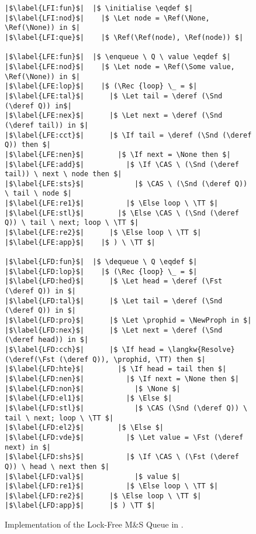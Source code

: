 \documentclass[a4paper, 10pt]{report}
\theoremstyle{definition}
\newcommand{\initialise}{\operatorname{initialize}}
\newcommand{\enqueue}{\operatorname{enqueue}}
\newcommand{\dequeue}{\operatorname{dequeue}}
\newcommand{\msq}{M\&S Queue}
\newcommand{\lfmsq}{Lock-Free \msq{}}
\begin{document}
\begin{figure}
\begin{verbatim}
|$\label{LFI:fun}$|  |$ \initialise \eqdef $|
|$\label{LFI:nod}$|    |$ \Let node = \Ref(\None, \Ref(\None)) in $|
|$\label{LFI:que}$|    |$ \Ref(\Ref(node), \Ref(node)) $|

|$\label{LFE:fun}$|  |$ \enqueue \ Q \ value \eqdef $|
|$\label{LFE:nod}$|    |$ \Let node = \Ref(\Some value, \Ref(\None)) in $|
|$\label{LFE:lop}$|    |$ (\Rec {loop} \_ = $|
|$\label{LFE:tal}$|      |$ \Let tail = \deref (\Snd (\deref Q)) in$|
|$\label{LFE:nex}$|      |$ \Let next = \deref (\Snd (\deref tail)) in $|
|$\label{LFE:cct}$|      |$ \If tail = \deref (\Snd (\deref Q)) then $|
|$\label{LFE:nen}$|        |$ \If next = \None then $|
|$\label{LFE:add}$|          |$ \If \CAS \ (\Snd (\deref tail)) \ next \ node then $|
|$\label{LFE:sts}$|            |$ \CAS \ (\Snd (\deref Q)) \ tail \ node $|
|$\label{LFE:re1}$|          |$ \Else loop \ \TT $|
|$\label{LFE:stl}$|        |$ \Else \CAS \ (\Snd (\deref Q)) \ tail \ next; loop \ \TT $|
|$\label{LFE:re2}$|      |$ \Else loop \ \TT $|
|$\label{LFE:app}$|    |$ ) \ \TT $|

|$\label{LFD:fun}$|  |$ \dequeue \ Q \eqdef $|
|$\label{LFD:lop}$|    |$ (\Rec {loop} \_ = $|
|$\label{LFD:hed}$|      |$ \Let head = \deref (\Fst (\deref Q)) in $|
|$\label{LFD:tal}$|      |$ \Let tail = \deref (\Snd (\deref Q)) in $|
|$\label{LFD:pro}$|      |$ \Let \prophid = \NewProph in $|
|$\label{LFD:nex}$|      |$ \Let next = \deref (\Snd (\deref head)) in $|
|$\label{LFD:cch}$|      |$ \If head = \langkw{Resolve} (\deref(\Fst (\deref Q)), \prophid, \TT) then $|
|$\label{LFD:hte}$|        |$ \If head = tail then $|
|$\label{LFD:nen}$|          |$ \If next = \None then $|
|$\label{LFD:non}$|            |$ \None $|
|$\label{LFD:el1}$|          |$ \Else $|
|$\label{LFD:stl}$|            |$ \CAS (\Snd (\deref Q)) \ tail \ next; loop \ \TT $|
|$\label{LFD:el2}$|        |$ \Else $|
|$\label{LFD:vde}$|          |$ \Let value = \Fst (\deref next) in $|
|$\label{LFD:shs}$|          |$ \If \CAS \ (\Fst (\deref Q)) \ head \ next then $|
|$\label{LFD:val}$|            |$ value $|
|$\label{LFD:re1}$|          |$ \Else loop \ \TT $|
|$\label{LFD:re2}$|      |$ \Else loop \ \TT $|
|$\label{LFD:app}$|      |$ ) \TT $|
\end{verbatim}
\caption{Implementation of the \lfmsq{} in \heaplang.}
\label{LFMSQ:implementation:code}
\end{figure}
\end{document}

